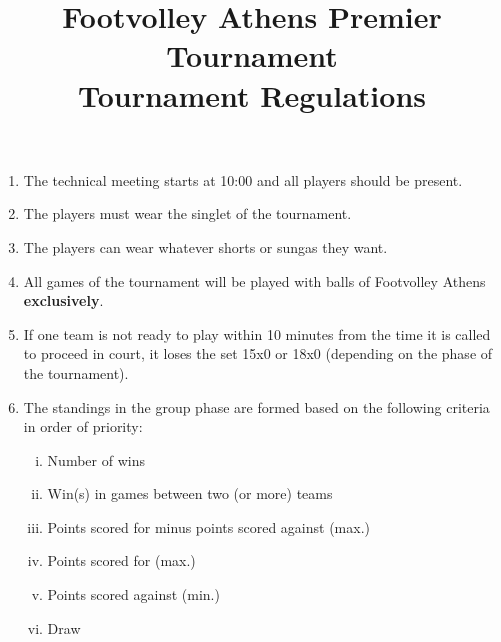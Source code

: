 \documentclass[a4paper,11pt]{article}
\title{Footvolley Athens Premier Tournament \\ Tournament Regulations}
\date{}
\begin{document}
\maketitle
\thispagestyle{fancy}

\vspace{-3cm}

\begin{enumerate}

\item The technical meeting starts at 10:00 and all players should be present.

\item The players must wear the singlet of the tournament.

\item The players can wear whatever shorts or sungas they want.

\item All games of the tournament will be played with balls of Footvolley Athens
  \textbf{exclusively}.

\item If one team is not ready to play within 10 minutes from the time it is
  called to proceed in court, it loses the set 15x0 or 18x0 (depending on the
  phase of the tournament).




\item The standings in the group phase are formed based on the following
  criteria in order of priority:

  \begin{enumerate}[i)]
  \item Number of wins
  \item Win(s) in games between two (or more) teams
  \item Points scored for minus points scored against (max.)
  \item Points scored for (max.)
  \item Points scored against (min.)
  \item Draw %
  \end{enumerate}


\end{enumerate}
\end{document}
